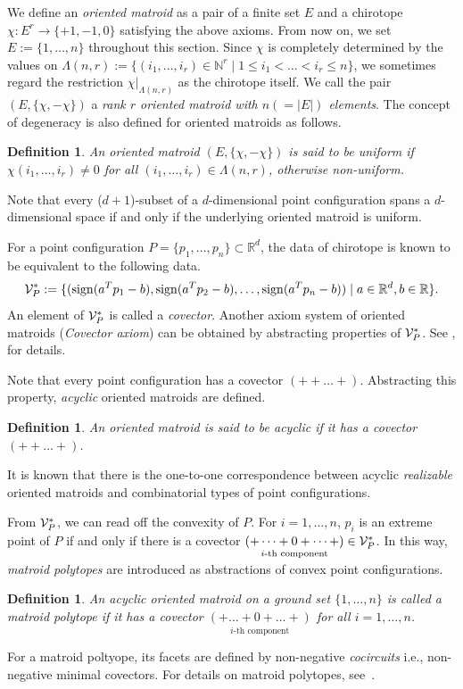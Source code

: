 \documentclass{article}
\newtheorem{defn2}[thm]{\bfseries Definition}
\begin{document}
We define an {\it oriented matroid\/} as a pair of a finite set $E$ and a chirotope $\chi:E^{r} \rightarrow \{ +1,-1,0 \}$
satisfying the above axioms.
From now on, we set $E:= \{ 1,\dots,n\}$ throughout this section.
Since $\chi$ is completely determined by the values on 
$\Lambda (n,r):=\{ (i_1,...,i_r) \in \mathbb{N}^r \mid 1 \leq i_1 < \dots < i_r \leq n \}$,
we sometimes regard the restriction $\chi |_{\Lambda (n,r)}$ as the chirotope itself.
We call the pair $(E, \{ \chi ,-\chi \} )$ a {\it rank $r$ oriented matroid with $n(=|E|)$ elements}.
The concept of degeneracy is also defined for oriented matroids as follows.
\begin{defn2}
\label{def:uniform}
An oriented matroid $(E,\{ \chi,-\chi \})$ is said to be {\it uniform\/} 
if $\chi (i_{1},\dots,i_{r}) \neq 0$ for all $(i_{1},\dots ,i_{r}) \in \Lambda (n,r)$,
otherwise {\it non-uniform}.  
\end{defn2}
Note that every ($d+1$)-subset of a $d$-dimensional point configuration spans a $d$-dimensional space if and only if
the underlying oriented matroid is uniform.

For a point configuration $P=\{ p_1,\dots,p_n \} \subset \mathbb{R}^d$, 
the data of chirotope is known to be equivalent to the following data.
\begin{equation}
 {\cal V}_P^* := \{ ({\rm sign}(a^T p_1 - b), {\rm sign}(a^T p_2 - b), \dots, {\rm sign}(a^T p_n - b)) \mid a \in \mathbb{R}^d, b \in \mathbb{R} \}. 
 \label{def:covectors}
\end{equation}
An element of ${\cal V}^*_P$ is called a {\it covector}.
Another axiom system of oriented matroids ({\it Covector axiom}) can be obtained by abstracting properties of ${\cal V}_P^*$.
See \cite[Chapter 3]{BLSWZ99}, for details.

Note that every point configuration has a covector $(++\dots +)$.
Abstracting this property, {\it acyclic} oriented matroids are defined.
\begin{defn2}
\label{def:acyclic}
An oriented matroid is said to be {\it acyclic} if it has a covector ${(++ \dots +)}$.
\end{defn2}
It is known that there is the one-to-one correspondence between acyclic {\it realizable} oriented matroids
and combinatorial types of point configurations.

From ${\cal V}_P^*$, we can read off the convexity of $P$.
For $i=1,\dots,n$, $p_i$ is an extreme point of $P$ if and only if there is a covector  
$\underset{\text{$i$-th component}}{(+\dots +0+\dots +)} \in {\cal V}_P^*$.
In this way, {\it matroid polytopes} are introduced as abstractions of convex point configurations.
\begin{defn2}
\label{def:matroid_polytope}
An acyclic oriented matroid on a ground set $\{ 1,\dots,n\}$ 
is called a {\it matroid polytope} if it has a covector 
$\underset{\text{$i$-th component}}{(+\dots +0+\dots +)}$ for all $i=1,\dots,n$.
\end{defn2}
For a matroid poltyope, its facets are defined by non-negative {\it cocircuits} i.e., non-negative minimal covectors.
For details on matroid polytopes, see~\cite[Chapter 9]{BLSWZ99}.
\end{document}
